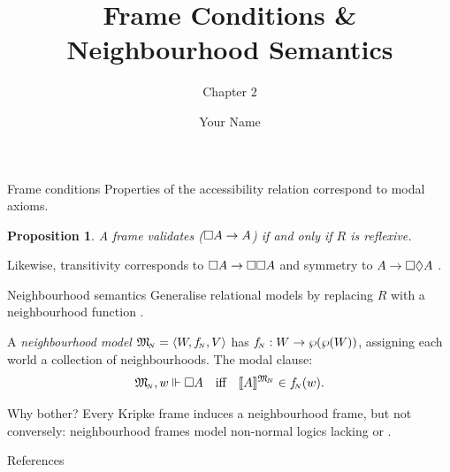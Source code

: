 \documentclass{beamer}
\title{Frame Conditions \& Neighbourhood Semantics}
\subtitle{Chapter 2}
\author{Your Name}
\institute{Your Department \\ University of California, Davis}
\date{}
\newtheorem{proposition}{Proposition}
\begin{document}
\frame{\titlepage}

\begin{frame}{Frame conditions}
  Properties of the accessibility relation correspond to modal axioms.
  \begin{proposition}
    A frame \FR{} validates \tax{} ($\Box A \to A$) if and only if $R$ is
    reflexive.
  \end{proposition}
  Likewise, transitivity corresponds to $\Box A \to \Box\Box A$ and symmetry to
  $A \to \Box\Diamond A$ \parencite[ch.~3]{blackburn2001}.
\end{frame}

\begin{frame}{Neighbourhood semantics}
  Generalise relational models by replacing $R$ with a neighbourhood function
  \parencite{scott1970, pacuit2017}.
  \begin{definition}
    A \emph{neighbourhood model} ${\mathfrak{M}_{\!\scriptscriptstyle N}} = \langle W, {f_{\!\scriptscriptstyle N}}, V \rangle$ has
    ${f_{\!\scriptscriptstyle N}} : W \to \wp(\wp(W))$, assigning each world a collection of
    neighbourhoods.  The modal clause:
    \[
      {\mathfrak{M}_{\!\scriptscriptstyle N}},w \Vdash \Box A
      \quad\text{iff}\quad
      \llbracket A\rrbracket^{{\mathfrak{M}_{\!\scriptscriptstyle N}}} \in {f_{\!\scriptscriptstyle N}}(w).
    \]
  \end{definition}
  \begin{block}{Why bother?}
    Every Kripke frame induces a neighbourhood frame, but not conversely:
    neighbourhood frames model non-normal logics lacking \kax{} or \nrule{}
    \parencite{chellas1980}.
  \end{block}
\end{frame}

\begin{frame}[allowframebreaks]{References}
  \printbibliography
\end{frame}
\end{document}
